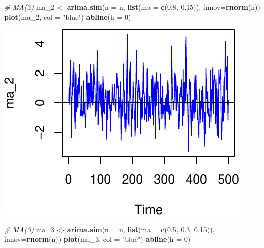 \documentclass[11pt,]{article}
\newenvironment{Shaded}{\begin{snugshade}}{\end{snugshade}}
\newcommand{\KeywordTok}[1]{\textcolor[rgb]{0.13,0.29,0.53}{\textbf{#1}}}
\newcommand{\DataTypeTok}[1]{\textcolor[rgb]{0.13,0.29,0.53}{#1}}
\newcommand{\DecValTok}[1]{\textcolor[rgb]{0.00,0.00,0.81}{#1}}
\newcommand{\FloatTok}[1]{\textcolor[rgb]{0.00,0.00,0.81}{#1}}
\newcommand{\StringTok}[1]{\textcolor[rgb]{0.31,0.60,0.02}{#1}}
\newcommand{\CommentTok}[1]{\textcolor[rgb]{0.56,0.35,0.01}{\textit{#1}}}
\newcommand{\NormalTok}[1]{#1}
\begin{document}
\begin{Shaded}
\begin{Highlighting}[]
\CommentTok{# MA(2)}
\NormalTok{ma_}\DecValTok{2}\NormalTok{ <-}\StringTok{ }\KeywordTok{arima.sim}\NormalTok{(}\DataTypeTok{n =}\NormalTok{ n, }\KeywordTok{list}\NormalTok{(}\DataTypeTok{ma =} \KeywordTok{c}\NormalTok{(}\FloatTok{0.8}\NormalTok{, }\FloatTok{0.15}\NormalTok{)), }\DataTypeTok{innov=}\KeywordTok{rnorm}\NormalTok{(n))}
\KeywordTok{plot}\NormalTok{(ma_}\DecValTok{2}\NormalTok{, }\DataTypeTok{col =} \StringTok{"blue"}\NormalTok{)}
\KeywordTok{abline}\NormalTok{(}\DataTypeTok{h =} \DecValTok{0}\NormalTok{)}
\end{Highlighting}
\end{Shaded}

\begin{center}\includegraphics{FMC_T4_PhD_ARMA_GARCH_files/figure-latex/MA-3} \end{center}

\begin{Shaded}
\begin{Highlighting}[]
\CommentTok{# MA(3)}
\NormalTok{ma_}\DecValTok{3}\NormalTok{ <-}\StringTok{ }\KeywordTok{arima.sim}\NormalTok{(}\DataTypeTok{n =}\NormalTok{ n, }\KeywordTok{list}\NormalTok{(}\DataTypeTok{ma =} \KeywordTok{c}\NormalTok{(}\FloatTok{0.5}\NormalTok{, }\FloatTok{0.3}\NormalTok{, }\FloatTok{0.15}\NormalTok{)), }\DataTypeTok{innov=}\KeywordTok{rnorm}\NormalTok{(n))}
\KeywordTok{plot}\NormalTok{(ma_}\DecValTok{3}\NormalTok{, }\DataTypeTok{col =} \StringTok{"blue"}\NormalTok{)}
\KeywordTok{abline}\NormalTok{(}\DataTypeTok{h =} \DecValTok{0}\NormalTok{)}
\end{Highlighting}
\end{Shaded}
\end{document}
